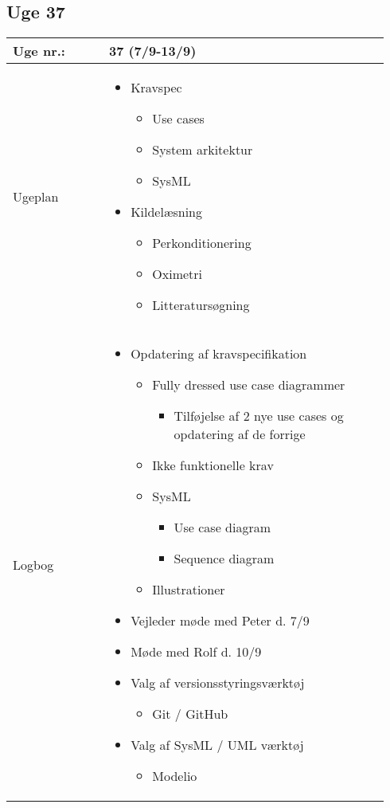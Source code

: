 	\subsection{Uge 37} \label{app:logUge37}
	\begin{longtable}{|p{0.24\linewidth}|p{0.7\linewidth}|}
		\hline
		Uge nr.: & 37 (7/9-13/9) \\ \hline
		Ugeplan & 
		\begin{itemize}
			\item Kravspec
			\begin{itemize}
				\item Use cases
				\item System arkitektur
				\item 	SysML
			\end{itemize}
			\item Kildelæsning
			\begin{itemize}
				\item 	Perkonditionering
				\item Oximetri 
				\item Litteratursøgning 
			\end{itemize}
		\end{itemize}
		
		\\ \hline
		Logbog & 
		\begin{itemize}
			\item Opdatering af kravspecifikation
			\begin{itemize}
				\item Fully dressed use case diagrammer
				\begin{itemize}
					\item Tilføjelse af 2 nye use cases og opdatering af de forrige
				\end{itemize}
				\item Ikke funktionelle krav
				\item SysML
				\begin{itemize}
					\item Use case diagram 
					\item Sequence diagram
				\end{itemize}
				\item Illustrationer 
			\end{itemize}
			\item Vejleder møde med Peter d. 7/9
			\item Møde med Rolf d. 10/9
			\item Valg af versionsstyringsværktøj
			\begin{itemize}
			\item 	Git / GitHub
			\end{itemize}
			\item Valg af SysML / UML værktøj
			\begin{itemize}
				\item Modelio 
			\end{itemize}
		\end{itemize}
		\\ \hline
	\end{longtable}
	

